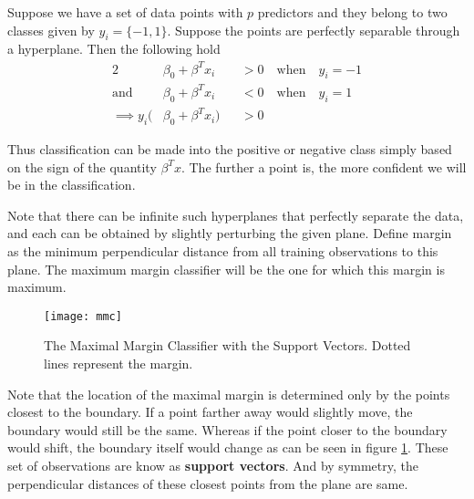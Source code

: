 \documentclass[../statistical_learning_notes.tex]{subfiles}
\begin{document}
    Suppose we have a set of data points with $p$ predictors and they belong to two classes given by $y_{i} = \{-1 , 1\}$. Suppose the points are perfectly separable through a hyperplane. Then the following hold
    \begin{alignat*}{2}
        &\beta_{0} + \beta^{T}x_{i} &&> 0 \quad \text{when} \quad y_{i} = -1\\
        \text{and} \quad &\beta_{0} + \beta^{T}x_{i} &&< 0 \quad \text{when} \quad y_{i} = 1\\
        \implies y_{i}(&\beta_{0} + \beta^{T}x_{i}) &&> 0
    \end{alignat*}

    Thus classification can be made into the positive or negative class simply based on the sign of the quantity $\beta^{T}x$. The further a point is, the more confident we will be in the classification.\newline

    Note that there can be infinite such hyperplanes that perfectly separate the data, and each can be obtained by slightly perturbing the given plane. Define margin as the minimum perpendicular distance from all training observations to this plane. The maximum margin classifier will be the one for which this margin is maximum.\newline

    \begin{figure}[h]
    \texttt{[image: mmc]}
    \centering
    \caption{The Maximal Margin Classifier with the Support Vectors. Dotted lines represent the margin.}
    \label{fig:mmc} %
    \end{figure}

    Note that the location of the maximal margin is determined only by the points closest to the boundary. If a point farther away would slightly move, the boundary would still be the same. Whereas if the point closer to the boundary would shift, the boundary itself would change as can be seen in figure \ref{fig:mmc}. These set of observations are know as \textbf{support vectors}. And by symmetry, the perpendicular distances of these closest points from the plane are same.

    
\end{document}
